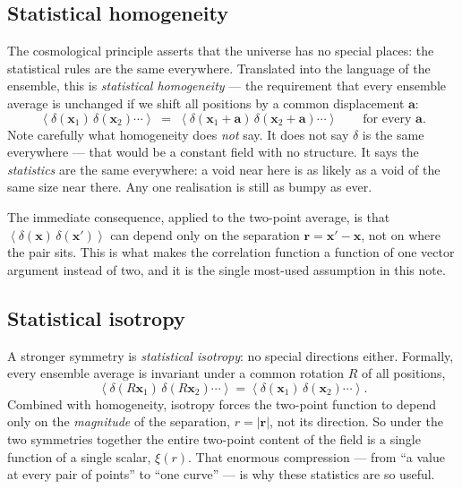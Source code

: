 \documentclass[12pt]{article}
\newcommand{\bx}{\mathbf{x}}
\newcommand{\ba}{\mathbf{a}}
\newcommand{\br}{\mathbf{r}}
\newcommand{\avg}[1]{\left\langle #1 \right\rangle}
\begin{document}
\subsection{Statistical homogeneity}
\label{sec:homogeneity}

The cosmological principle asserts that the universe has no special
places: the statistical rules are the same everywhere.  Translated into
the language of the ensemble, this is \emph{statistical homogeneity} ---
the requirement that every ensemble average is unchanged if we shift all
positions by a common displacement $\ba$:
\begin{equation}
  \avg{\delta(\bx_1)\,\delta(\bx_2)\cdots}
  \;=\;
  \avg{\delta(\bx_1+\ba)\,\delta(\bx_2+\ba)\cdots}
  \qquad\text{for every }\ba .
  \label{eq:homog}
\end{equation}
Note carefully what homogeneity does \emph{not} say.  It does not say
$\delta$ is the same everywhere --- that would be a constant field with
no structure.  It says the \emph{statistics} are the same everywhere:
a void near here is as likely as a void of the same size near there.
Any one realisation is still as bumpy as ever.

The immediate consequence, applied to the two-point average, is that
$\avg{\delta(\bx)\,\delta(\bx')}$ can depend only on the separation
$\br = \bx' - \bx$, not on where the pair sits.  This is what makes the
correlation function a function of one vector argument instead of two,
and it is the single most-used assumption in this note.

\subsection{Statistical isotropy}
\label{sec:isotropy}

A stronger symmetry is \emph{statistical isotropy}: no special
directions either.  Formally, every ensemble average is invariant under
a common rotation $R$ of all positions,
\begin{equation}
  \avg{\delta(R\bx_1)\,\delta(R\bx_2)\cdots}
  = \avg{\delta(\bx_1)\,\delta(\bx_2)\cdots}.
\end{equation}
Combined with homogeneity, isotropy forces the two-point function to
depend only on the \emph{magnitude} of the separation, $r = |\br|$, not
its direction.  So under the two symmetries together the entire
two-point content of the field is a single function of a single scalar,
$\xi(r)$.  That enormous compression --- from ``a value at every pair of
points'' to ``one curve'' --- is why these statistics are so useful.
\end{document}
